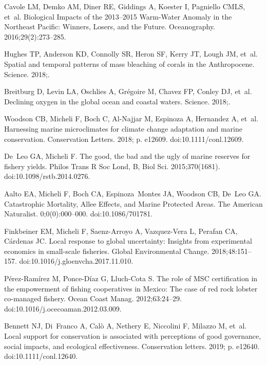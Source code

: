 \documentclass[10pt,letterpaper]{article}
\begin{document}
\begin{thebibliography}{10}
Cavole LM, Demko AM, Diner RE, Giddings A, Koester I, Pagniello CMLS, et~al.
\newblock Biological Impacts of the 2013–2015 Warm-Water Anomaly in the
  Northeast Pacific: Winners, Losers, and the Future.
\newblock Oceanography. 2016;29(2):273--285.

Hughes TP, Anderson KD, Connolly SR, Heron SF, Kerry JT, Lough JM, et~al.
\newblock Spatial and temporal patterns of mass bleaching of corals in the
  Anthropocene.
\newblock Science. 2018;.

Breitburg D, Levin LA, Oschlies A, Grégoire M, Chavez FP, Conley DJ, et~al.
\newblock Declining oxygen in the global ocean and coastal waters.
\newblock Science. 2018;.

Woodson CB, Micheli F, Boch C, Al-Najjar M, Espinoza A, Hernandez A, et~al.
\newblock Harnessing marine microclimates for climate change adaptation and
  marine conservation.
\newblock Conservation Letters. 2018; p. e12609.
\newblock doi:{10.1111/conl.12609}.

De~Leo GA, Micheli F.
\newblock The good, the bad and the ugly of marine reserves for fishery yields.
\newblock Philos Trans R Soc Lond, B, Biol Sci. 2015;370(1681).
\newblock doi:{10.1098/rstb.2014.0276}.

Aalto EA, Micheli F, Boch CA, Espinoza~Montes JA, Woodson CB, De~Leo GA.
\newblock Catastrophic Mortality, Allee Effects, and Marine Protected Areas.
\newblock The American Naturalist. 0;0(0):000--000.
\newblock doi:{10.1086/701781}.

Finkbeiner EM, Micheli F, Saenz-Arroyo A, Vazquez-Vera L, Perafan CA, Cárdenas
  JC.
\newblock Local response to global uncertainty: Insights from experimental
  economics in small-scale fisheries.
\newblock Global Environmental Change. 2018;48:151--157.
\newblock doi:{10.1016/j.gloenvcha.2017.11.010}.

Pérez-Ramírez M, Ponce-Díaz G, Lluch-Cota S.
\newblock The role of MSC certification in the empowerment of fishing
  cooperatives in Mexico: The case of red rock lobster co-managed fishery.
\newblock Ocean Coast Manag. 2012;63:24--29.
\newblock doi:{10.1016/j.ocecoaman.2012.03.009}.

Bennett NJ, Di~Franco A, Calò A, Nethery E, Niccolini F, Milazzo M, et~al.
\newblock Local support for conservation is associated with perceptions of good
  governance, social impacts, and ecological effectiveness.
\newblock Conservation letters. 2019; p. e12640.
\newblock doi:{10.1111/conl.12640}.


\end{thebibliography}
\end{document}
